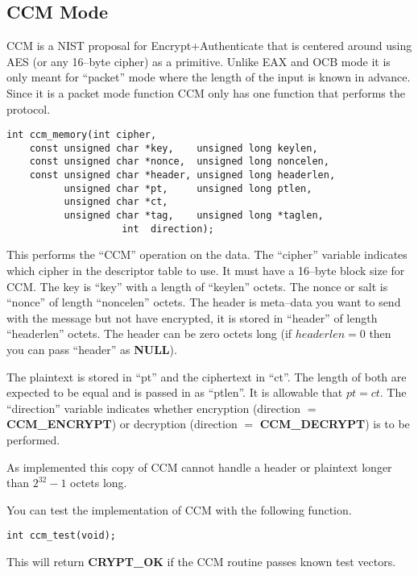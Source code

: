 \documentclass[a4paper]{book}
\begin{document}
\subsection{CCM Mode}
CCM is a NIST proposal for Encrypt+Authenticate that is centered around using AES (or any 16--byte cipher) as a primitive.  Unlike EAX and OCB mode
it is only meant for ``packet'' mode where the length of the input is known in advance.  Since it is a packet mode function CCM only has one 
function that performs the protocol.

\begin{verbatim}
int ccm_memory(int cipher,
    const unsigned char *key,    unsigned long keylen,
    const unsigned char *nonce,  unsigned long noncelen,
    const unsigned char *header, unsigned long headerlen,
          unsigned char *pt,     unsigned long ptlen,
          unsigned char *ct,
          unsigned char *tag,    unsigned long *taglen,
                    int  direction);
\end{verbatim}

This performs the ``CCM'' operation on the data.  The ``cipher'' variable indicates which cipher in the descriptor table to use.  It must have a 
16--byte block size for CCM.  The key is ``key'' with a length of ``keylen'' octets.  The nonce or salt is ``nonce'' of
length ``noncelen'' octets.  The header is meta--data you want to send with the message but not have encrypted, it is stored in ``header''
of length ``headerlen'' octets.  The header can be zero octets long (if $headerlen = 0$ then you can pass ``header'' as \textbf{NULL}).  

The plaintext is stored in ``pt'' and the ciphertext in ``ct''.  The length of both are expected to be equal and is passed in as ``ptlen''.  It is
allowable that $pt = ct$.  The ``direction'' variable indicates whether encryption (direction $=$ \textbf{CCM\_ENCRYPT}) or 
decryption (direction $=$ \textbf{CCM\_DECRYPT}) is to be performed.

As implemented this copy of CCM cannot handle a header or plaintext longer than $2^{32} - 1$ octets long.  

You can test the implementation of CCM with the following function.

\begin{verbatim}
int ccm_test(void);
\end{verbatim}

This will return \textbf{CRYPT\_OK} if the CCM routine passes known test vectors.
\end{document}
